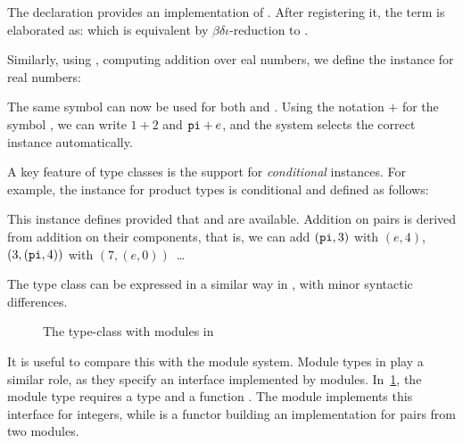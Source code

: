 
The declaration  provides an implementation of
. After registering it, the term  is elaborated as:
 which is equivalent by $\beta\delta\iota$-reduction
to .

Similarly, using , computing addition over eal numbers,
we define the instance for real numbers:


The same symbol  can now be used for both  and . Using
the notation $+$ for the symbol , we can write $1 + 2$ and $\pig + e$,
and the system selects the correct instance automatically.

A key feature of type classes is the support for \emph{conditional} instances.
For example, the instance for product types is conditional and defined as
follows:



This instance defines  provided that  and  are available. Addition on pairs is derived from addition on their
components, that is, we can add $(\pig, 3)$ with $(e, 4)$, $(3,(\pig, 4))$ with
$(7, (e, 0))$~\dots

The type class  can be expressed in a similar way in \haskell, with
minor syntactic differences.

\begin{figure}
  \centering
  \begin{subfigure}{0.45\textwidth}
    \centering
    
  \end{subfigure}
  \begin{subfigure}{0.45\textwidth}
    
  \end{subfigure}
  \vspace{5pt}

  \begin{subfigure}{0.6\textwidth}
    
  \end{subfigure}
  \vspace{-10pt}
  \caption{The  type-class with modules in \ocaml}
  \label{fig:add-module}
\end{figure}

It is useful to compare this with the \ocaml module system. Module types in
\ocaml play a similar role, as they specify an interface implemented by
modules. In~\cref{fig:add-module}, the module type  requires a type  and a
function . The module  implements this interface for
integers, while  is a functor building an implementation for
pairs from two modules.

